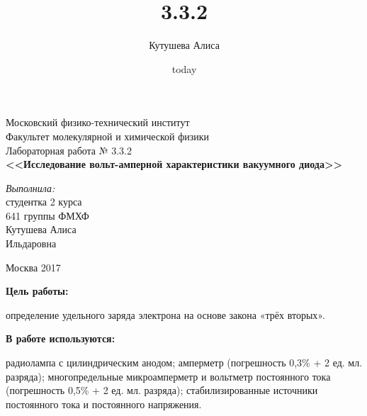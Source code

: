 \documentclass[a4paper,12pt]{article}
\title{3.3.2}
\author{Кутушева Алиса}
\date{today}
\begin{document}
	
	\begin{titlepage}
		\begin{center} 
			
			\large Московский физико-технический институт\\
			Факультет молекулярной и химической физики\\
			\vspace{7cm}
			\huge Лабораторная работа № 3.3.2\\
			\textbf{\Large <<Исследование вольт-амперной характеристики вакуумного диода>>}\\
		\end{center} 
		
		\vspace{7.5cm}
		{\par \raggedleft \large \emph{Выполнила:}\\ студентка 2 курса\\ 641 группы ФМХФ\\ Кутушева Алиса\\ Ильдаровна \par}
		\begin{center}
			\vfill Москва 2017
		\end{center}
	\end{titlepage}
\newpage
\setcounter{page}{2}

\begin{center}
\end{center}

	\hspace{0.2cm}\textbf{Цель работы:}
	\par определение удельного заряда электрона на основе закона «трёх вторых».


	\hspace{0.2cm}\textbf{В работе используются:}
	\par радиолампа с цилиндрическим анодом; амперметр (погрешность 0,3\% + 2 ед. мл. разряда); многопредельные микроамперметр и вольтметр постоянного тока (погрешность 0,5\% + 2 ед. мл. разряда); стабилизированные источники постоянного тока и постоянного напряжения.
	
\end{document}
